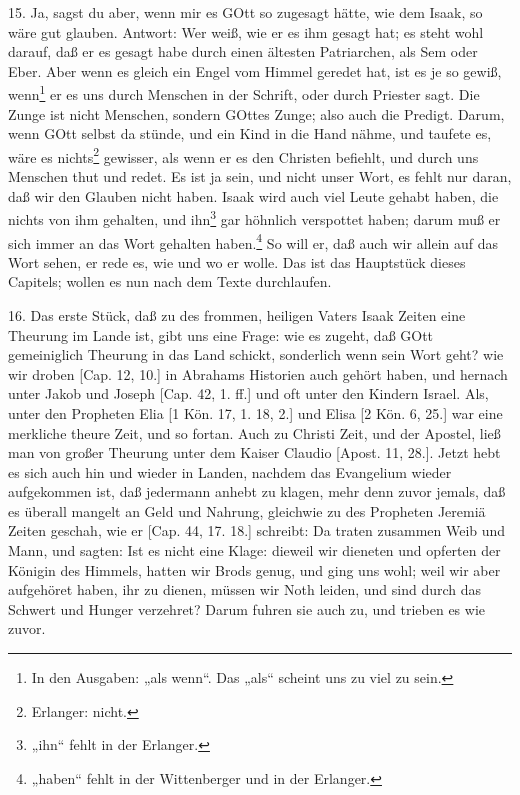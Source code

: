 15. Ja, sagst du aber, wenn mir es GOtt so zugesagt hätte, wie dem Isaak, so wäre gut glauben. Antwort: Wer weiß, wie er es ihm gesagt hat; es steht wohl darauf, daß er es gesagt habe durch einen ältesten Patriarchen, als Sem oder Eber. Aber wenn es gleich ein Engel vom Himmel geredet hat, ist es je so gewiß, wenn\footnote{In den Ausgaben: „als wenn“. Das „als“ scheint uns zu viel zu sein.} er es uns durch Menschen in der Schrift,
oder durch Priester sagt. Die Zunge ist nicht Menschen, sondern GOttes Zunge; also auch die Predigt. Darum, wenn GOtt selbst da stünde, und ein Kind in die Hand nähme, und taufete es, wäre es nichts\footnote{Erlanger: nicht.} gewisser, als wenn er es den Christen befiehlt, und durch uns Menschen thut und redet. Es ist ja sein, und nicht unser Wort, es fehlt nur daran, daß wir den Glauben nicht haben. Isaak wird auch viel Leute gehabt haben, die nichts von ihm gehalten, und ihn\footnote{„ihn“ fehlt in der Erlanger.} gar höhnlich verspottet haben; darum muß er sich immer an das Wort gehalten haben.\footnote{„haben“ fehlt in der Wittenberger und in der Erlanger.} So will er, daß auch wir allein auf das Wort sehen, er rede es, wie und wo er wolle. Das ist das Hauptstück dieses Capitels; wollen es nun nach dem Texte durchlaufen.

16. Das erste Stück, daß zu des frommen, heiligen Vaters Isaak Zeiten eine Theurung im Lande ist, gibt uns eine Frage: wie es zugeht, daß GOtt gemeiniglich Theurung in das Land schickt, sonderlich wenn sein Wort geht? wie wir droben [Cap. 12, 10.] in Abrahams Historien auch gehört haben, und hernach unter Jakob und Joseph [Cap. 42, 1. ff.] und oft unter den Kindern Israel. Als, unter den Propheten Elia [1 Kön. 17, 1. 18, 2.] und Elisa [2 Kön. 6, 25.] war eine merkliche theure Zeit, und so fortan. Auch zu Christi Zeit, und der Apostel, ließ man von großer Theurung unter dem Kaiser Claudio [Apost. 11, 28.]. Jetzt hebt es sich auch hin und wieder in Landen, nachdem das Evangelium wieder aufgekommen ist, daß jedermann anhebt zu klagen, mehr denn zuvor jemals, daß es überall mangelt an Geld und Nahrung, gleichwie zu des Propheten Jeremiä Zeiten geschah, wie er [Cap. 44, 17. 18.] schreibt: Da traten zusammen Weib und Mann, und sagten: Ist es nicht eine Klage: dieweil wir dieneten und opferten der Königin des Himmels, hatten wir Brods genug, und ging uns wohl; weil wir aber aufgehöret haben, ihr zu dienen, müssen wir Noth leiden, und sind durch das Schwert und Hunger verzehret? Darum fuhren sie auch zu, und trieben es wie zuvor.

